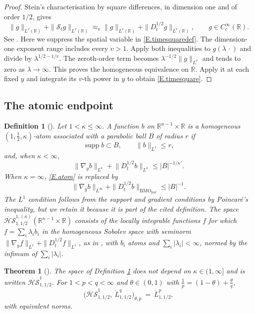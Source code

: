 \documentclass[12pt,leqno]{amsart}
\numberwithin{equation}{section}
\DeclareMathOperator{\supp}{supp}
\newcommand{\R}{\mathbb R}
\newcommand{\abs}[1]{\left\vert#1\right\vert}
\newcommand{\dhalf}{D_t^{1/2}}
\newcommand{\BMOpar}{\mathrm{BMO}_{\mathrm{par}}}
\newcommand{\HS}{\dot{\mathcal{HS}}^{1}_{1,1/2}}
\theoremstyle{plain}
\newtheorem{theorem}[equation]{Theorem}
\newtheorem{definition}[equation]{Definition}
\theoremstyle{remark}
\begin{document}
\begin{proof}
Stein's characterisation by square differences, in dimension one and
of order $1/2$, gives
\[
 \|g\|_{L^v(\R)}+\|\mathcal S_t g\|_{L^v(\R)}
 \approx_v \|g\|_{L^v(\R)}+\|\dhalf g\|_{L^v(\R)},
 \qquad g\in C_c^\infty(\R).
\]
See \cite[Theorem B, (1.7)]{BJM}. Here we suppress the spatial variable
in \eqref{E.timesquaredef}. The dimension-one exponent range includes
every $v>1$. Apply both inequalities to $g(\lambda\,\cdot)$ and divide
by $\lambda^{1/2-1/v}$. The zeroth-order term becomes
$\lambda^{-1/2}\|g\|_{L^v}$ and tends to zero as $\lambda\to\infty$.
This proves the homogeneous equivalence on $\R$. Apply it at each fixed
$y$ and integrate its $v$-th power in $y$ to obtain \eqref{E.timesquare}.
\end{proof}

\subsection{The atomic endpoint}\label{ss.atoms}

\begin{definition}[{\cite[Definition 6.1]{DN}}]\label{D.atom}
Let $1<\kappa\le\infty$. A function $b$ on $\R^{n-1}\times\R$ is a homogeneous
$(1,\tfrac12,\kappa)$-atom associated with a parabolic ball $B$ of radius $r$ if
\[
  \supp b\subset B,\qquad \|b\|_{L^1}\le r,
\]
and, when $\kappa<\infty$,
\begin{equation}\label{E.atom}
  \|\nabla_yb\|_{L^\kappa}+\big\|\dhalf b\big\|_{L^\kappa}\le\abs B^{-1/\kappa'} .
\end{equation}
When $\kappa=\infty$, \eqref{E.atom} is replaced by
\[
 \|\nabla_yb\|_{L^\infty}+\|\dhalf b\|_{\BMOpar}\le\abs B^{-1}.
\]
The $L^1$ condition follows from the support and gradient conditions by
Poincar\'e's inequality, but we retain it because it is part of the cited
definition. The space
$\dot{\mathcal{HS}}^{1,(\kappa)}_{1,1/2}(\R^{n-1}\times\R)$ consists of the
locally integrable functions $f$ for which
$f=\sum_i\lambda_ib_i$ in the homogeneous Sobolev space with seminorm
$\|\nabla_y f\|_{L^1}+\|\dhalf f\|_{L^1}$, as in \cite[\S2.2]{DN},
with $b_i$ atoms and $\sum_i\abs{\lambda_i}<\infty$, normed by the infimum of
$\sum_i\abs{\lambda_i}$.
\end{definition}

\begin{theorem}[{\cite[Propositions 6.45 and 6.46]{DN}}]\label{T.interp}
The space of Definition \ref{D.atom} does not depend on $\kappa\in(1,\infty]$ and
is written $\HS$. For $1<p<q<\infty$ and $\theta\in(0,1)$ with
$\frac1p=(1-\theta)+\frac\theta q$,
\begin{equation}\label{E.interp}
  \Big(\HS,\ \dot L^q_{1,1/2}\Big)_{\theta,p}\ =\ \dot L^p_{1,1/2} ,
\end{equation}
with equivalent norms.
\end{theorem}
\end{document}

